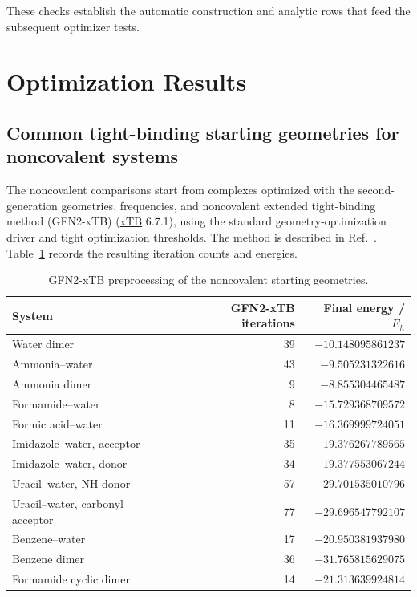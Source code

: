 \documentclass[10pt]{article}
\begin{document}
{These checks establish the automatic construction and analytic rows that feed
the subsequent optimizer tests.

\section{Optimization Results}

\subsection{Common tight-binding starting geometries for noncovalent systems}

The noncovalent comparisons start from complexes optimized with the {second-generation geometries,
frequencies, and noncovalent extended tight-binding method (GFN2-xTB)}
(\href{https://github.com/grimme-lab/xtb}{xTB} 6.7.1), using the standard
geometry-optimization driver and tight optimization thresholds.  The method is
described in Ref.~\cite{BannwarthEhlertGrimme2019GFN2xTB}.  {Table~\ref{tab:gfn2xtb-starting-geometries}
records the resulting iteration counts and energies.}

\begin{table}[htbp]
\centering
\scriptsize
\caption{GFN2-xTB preprocessing of the noncovalent starting geometries.}
\label{tab:gfn2xtb-starting-geometries}
\begin{tabular}{lrr}
\toprule
System & GFN2-xTB iterations & Final energy / $E_h$ \\
\midrule
Water dimer & 39 & $-10.148095861237$ \\
Ammonia--water & 43 & $-9.505231322616$ \\
Ammonia dimer & 9 & $-8.855304465487$ \\
Formamide--water & 8 & $-15.729368709572$ \\
Formic acid--water & 11 & $-16.369999724051$ \\
Imidazole--water, acceptor & 35 & $-19.376267789565$ \\
Imidazole--water, donor & 34 & $-19.377553067244$ \\
Uracil--water, NH donor & 57 & $-29.701535010796$ \\
Uracil--water, carbonyl acceptor & 77 & $-29.696547792107$ \\
Benzene--water & 17 & $-20.950381937980$ \\
Benzene dimer & 36 & $-31.765815629075$ \\
Formamide cyclic dimer & 14 & $-21.313639924814$ \\
\bottomrule
\end{tabular}
\end{table}

}
\end{document}
